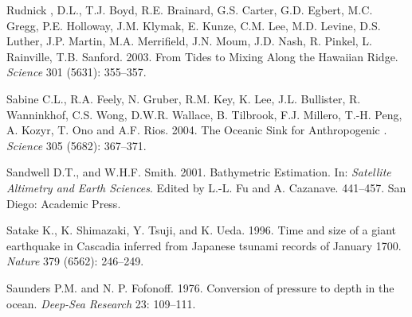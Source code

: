 \begin{thebibliography}{999}
Rudnick , D.L., T.J. Boyd, R.E. Brainard, G.S. Carter, G.D. Egbert,
M.C. Gregg, P.E. Holloway, J.M. Klymak, E. Kunze, C.M. Lee,
M.D. Levine, D.S. Luther, J.P. Martin, M.A. Merrifield, J.N. Moum,
J.D. Nash, R. Pinkel, L. Rainville, T.B. Sanford. 2003. From Tides to
Mixing Along the Hawaiian Ridge. \textit{Science} 301 (5631):
355--357.
%

Sabine C.L., R.A. Feely, N. Gruber, R.M. Key, K. Lee, J.L. Bullister,
R. Wanninkhof, C.S. Wong, D.W.R. Wallace, B. Tilbrook, F.J. Millero,
T.-H. Peng, A. Kozyr, T. Ono and A.F. Rios. 2004. The Oceanic Sink for
Anthropogenic \COtwo. \textit{Science} 305 (5682): 367--371.
%

Sandwell D.T., and W.H.F. Smith.  2001. Bathymetric Estimation. In:
\textit{Satellite Altimetry and Earth Sciences}. Edited by L.-L. Fu
and A. Cazanave. 441--457. San Diego: Academic Press.
%

Satake K., K. Shimazaki, Y. Tsuji, and K. Ueda.  1996. Time and size
of a giant earthquake in Cascadia inferred from Japanese tsunami
records of January 1700. \textit{Nature} 379 (6562): 246--249.
%

Saunders P.M. and N. P. Fofonoff.  1976. Conversion of pressure to
depth in the ocean. \textit{Deep-Sea Research} 23: 109--111.
%


\end{thebibliography}
